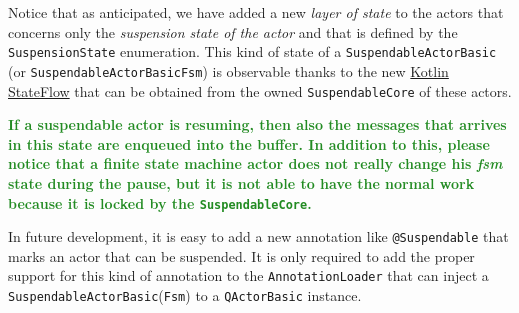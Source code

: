 Notice that as anticipated, we have added a new \textit{layer of state} to the actors that concerns only the \textit{suspension state of the actor} and that is defined by the \texttt{SuspensionState} enumeration.
This kind of state of a \texttt{SuspendableActorBasic} (or \texttt{SuspendableActorBasicFsm}) is observable thanks to the new \href{https://kotlin.github.io/kotlinx.coroutines/kotlinx-coroutines-core/kotlinx.coroutines.flow/-state-flow/}{Kotlin StateFlow} that can be obtained from the owned \texttt{SuspendableCore} of these actors.

\textcolor{ForestGreen}{\textbf{If a suspendable actor is resuming, then also the messages that arrives in this state are enqueued into the buffer. In addition to this, please notice that a finite state machine actor does not really change his \textit{fsm} state during the pause, but it is not able to have the normal work because it is locked by the \texttt{SuspendableCore}.}}

In future development, it is easy to add a new annotation like \texttt{@Suspendable} that marks an actor that can be suspended. It is only required to add the proper support for this kind of annotation to the \texttt{AnnotationLoader} that can inject a \texttt{SuspendableActorBasic}(\texttt{Fsm}) to a \texttt{QActorBasic} instance.